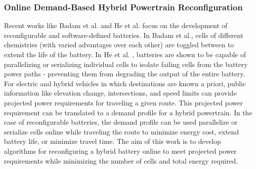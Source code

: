 \subsubsection{Online Demand-Based Hybrid Powertrain Reconfiguration}

Recent works like Badam et al. \cite{badam_software_2015} and He et al. \cite{he_case_2017} focus on the development of reconfigurable and software-defined batteries.
In Badam et al., cells of different chemistries (with varied advantages over each other) are toggled between to extend the life of the battery.
In He et al. \cite{he_case_2017}, batteries are shown to be capable of parallelizing or serializing individual cells to isolate failing cells from the battery power paths - preventing them from degrading the output of the entire battery.
For electric and hybrid vehicles in which destinations are known a priori, public information like elevation change, intersections, and speed limits can provide projected power requirements for traveling a given route.
This projected power requirement can be translated to a demand profile for a hybrid powertrain.
In the case of reconfigurable batteries, the demand profile can be used parallelize or serialize cells online while traveling the route to minimize energy cost, extend battery life, or minimize travel time.
The aim of this work is to develop algorithms for reconfiguring a hybrid battery online to meet projected power requirements while minimizing the number of cells and total energy required.

